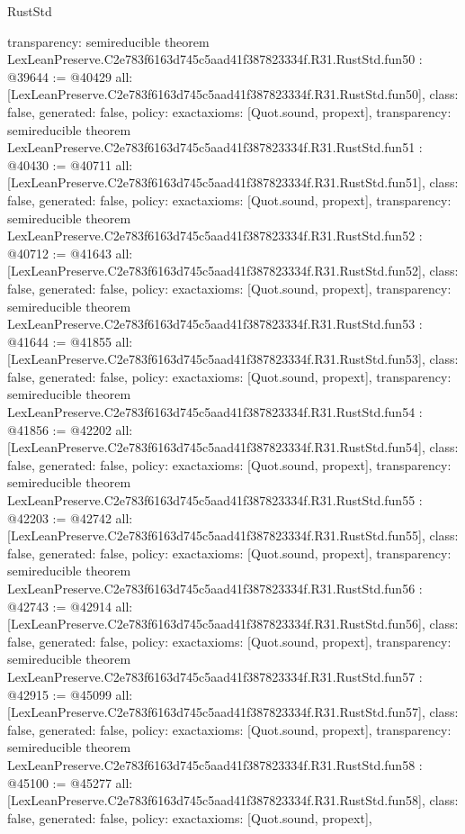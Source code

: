 \begin{lexlean}{RustStd}
\begin{coremodule}
{  transparency: semireducible
}
theorem LexLeanPreserve.C2e783f6163d745c5aad41f387823334f.R31.RustStd.fun50 : @39644 := @40429 {
  all: [LexLeanPreserve.C2e783f6163d745c5aad41f387823334f.R31.RustStd.fun50],
  class: false,
  generated: false,
  policy: exact{axioms: [Quot.sound, propext]},
  transparency: semireducible
}
theorem LexLeanPreserve.C2e783f6163d745c5aad41f387823334f.R31.RustStd.fun51 : @40430 := @40711 {
  all: [LexLeanPreserve.C2e783f6163d745c5aad41f387823334f.R31.RustStd.fun51],
  class: false,
  generated: false,
  policy: exact{axioms: [Quot.sound, propext]},
  transparency: semireducible
}
theorem LexLeanPreserve.C2e783f6163d745c5aad41f387823334f.R31.RustStd.fun52 : @40712 := @41643 {
  all: [LexLeanPreserve.C2e783f6163d745c5aad41f387823334f.R31.RustStd.fun52],
  class: false,
  generated: false,
  policy: exact{axioms: [Quot.sound, propext]},
  transparency: semireducible
}
theorem LexLeanPreserve.C2e783f6163d745c5aad41f387823334f.R31.RustStd.fun53 : @41644 := @41855 {
  all: [LexLeanPreserve.C2e783f6163d745c5aad41f387823334f.R31.RustStd.fun53],
  class: false,
  generated: false,
  policy: exact{axioms: [Quot.sound, propext]},
  transparency: semireducible
}
theorem LexLeanPreserve.C2e783f6163d745c5aad41f387823334f.R31.RustStd.fun54 : @41856 := @42202 {
  all: [LexLeanPreserve.C2e783f6163d745c5aad41f387823334f.R31.RustStd.fun54],
  class: false,
  generated: false,
  policy: exact{axioms: [Quot.sound, propext]},
  transparency: semireducible
}
theorem LexLeanPreserve.C2e783f6163d745c5aad41f387823334f.R31.RustStd.fun55 : @42203 := @42742 {
  all: [LexLeanPreserve.C2e783f6163d745c5aad41f387823334f.R31.RustStd.fun55],
  class: false,
  generated: false,
  policy: exact{axioms: [Quot.sound, propext]},
  transparency: semireducible
}
theorem LexLeanPreserve.C2e783f6163d745c5aad41f387823334f.R31.RustStd.fun56 : @42743 := @42914 {
  all: [LexLeanPreserve.C2e783f6163d745c5aad41f387823334f.R31.RustStd.fun56],
  class: false,
  generated: false,
  policy: exact{axioms: [Quot.sound, propext]},
  transparency: semireducible
}
theorem LexLeanPreserve.C2e783f6163d745c5aad41f387823334f.R31.RustStd.fun57 : @42915 := @45099 {
  all: [LexLeanPreserve.C2e783f6163d745c5aad41f387823334f.R31.RustStd.fun57],
  class: false,
  generated: false,
  policy: exact{axioms: [Quot.sound, propext]},
  transparency: semireducible
}
theorem LexLeanPreserve.C2e783f6163d745c5aad41f387823334f.R31.RustStd.fun58 : @45100 := @45277 {
  all: [LexLeanPreserve.C2e783f6163d745c5aad41f387823334f.R31.RustStd.fun58],
  class: false,
  generated: false,
  policy: exact{axioms: [Quot.sound, propext]},
}
\end{coremodule}
\end{lexlean}
